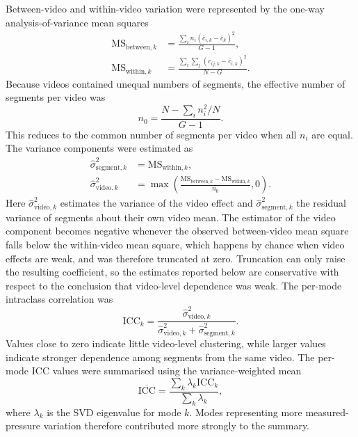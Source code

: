 \documentclass[11pt,a4paper]{article}
\begin{document}
Between-video and within-video variation were represented by the one-way analysis-of-variance mean squares
\begin{align}
\mathrm{MS}_{\mathrm{between},k}
&=\frac{\sum_i n_i(\bar c_{i,k}-\bar c_k)^2}{G-1},\\
\mathrm{MS}_{\mathrm{within},k}
&=\frac{\sum_i\sum_j(c_{ij,k}-\bar c_{i,k})^2}{N-G}.
\end{align}
Because videos contained unequal numbers of segments, the effective number of segments per video was
\begin{equation}
n_0=\frac{N-\sum_i n_i^2/N}{G-1}.
\end{equation}
This reduces to the common number of segments per video when all \(n_i\) are equal. The variance components were estimated as
\begin{align}
\widehat{\sigma}^2_{\mathrm{segment},k}
&=\mathrm{MS}_{\mathrm{within},k},\\
\widehat{\sigma}^2_{\mathrm{video},k}
&=\max\left(\frac{\mathrm{MS}_{\mathrm{between},k}-\mathrm{MS}_{\mathrm{within},k}}{n_0},0\right).
\end{align}
Here \(\widehat{\sigma}^2_{\mathrm{video},k}\) estimates the variance of the video effect and \(\widehat{\sigma}^2_{\mathrm{segment},k}\) the residual variance of segments about their own video mean. The estimator of the video component becomes negative whenever the observed between-video mean square falls below the within-video mean square, which happens by chance when video effects are weak, and was therefore truncated at zero. Truncation can only raise the resulting coefficient, so the estimates reported below are conservative with respect to the conclusion that video-level dependence was weak. The per-mode intraclass correlation was
\begin{equation}
\mathrm{ICC}_k = \frac{\widehat{\sigma}^2_{\mathrm{video},k}}{\widehat{\sigma}^2_{\mathrm{video},k} + \widehat{\sigma}^2_{\mathrm{segment},k}}.
\end{equation}
Values close to zero indicate little video-level clustering, while larger values indicate stronger dependence among segments from the same video. The per-mode ICC values were summarised using the variance-weighted mean
\begin{equation}
\overline{\mathrm{ICC}} = \frac{\sum_k \lambda_k \mathrm{ICC}_k}{\sum_k \lambda_k},
\end{equation}
where \(\lambda_k\) is the SVD eigenvalue for mode \(k\). Modes representing more measured-pressure variation therefore contributed more strongly to the summary.
\end{document}
